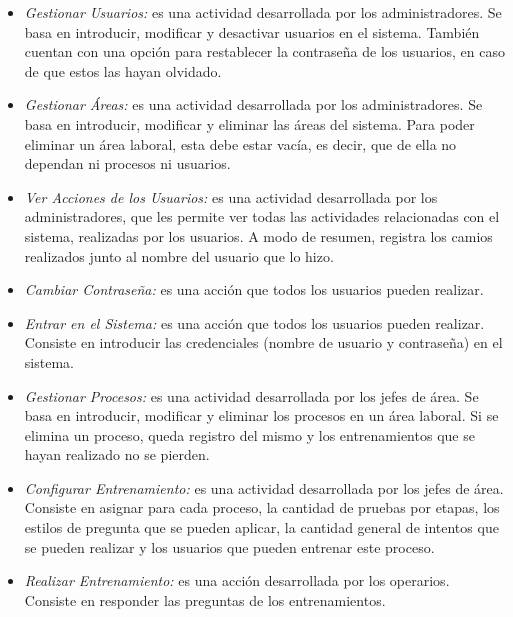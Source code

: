 \begin{itemize}
\item \textsl{Gestionar Usuarios:} es una actividad desarrollada por los administradores. Se basa en introducir, modificar y desactivar usuarios en el sistema. También cuentan con una opción para restablecer la contraseña de los usuarios, en caso de que estos las hayan olvidado.
\item \textsl{Gestionar Áreas:}  es una actividad desarrollada por los administradores. Se basa en introducir, modificar y eliminar las áreas del sistema. Para poder eliminar un área laboral, esta debe estar vacía, es decir, que de ella no dependan ni procesos ni usuarios.
\item \textsl{Ver Acciones de los Usuarios:}  es una actividad desarrollada por los administradores, que les permite ver todas las actividades relacionadas con el sistema, realizadas por los usuarios. A modo de resumen, registra los camios realizados junto al nombre del usuario que lo hizo.

\item \textsl{Cambiar Contraseña:} es una acción que todos los usuarios pueden realizar.
\item \textsl{Entrar en el Sistema:} es una acción que todos los usuarios pueden realizar. Consiste en introducir las credenciales (nombre de usuario y contraseña) en el sistema.

\item \textsl{Gestionar Procesos:} es una actividad desarrollada por los jefes de área. Se basa en introducir, modificar y eliminar los procesos en un área laboral. Si se elimina un proceso, queda registro del mismo y los entrenamientos que se hayan realizado no se pierden.
\item \textsl{Configurar Entrenamiento:}  es una actividad desarrollada por los jefes de área. Consiste en asignar para cada proceso, la cantidad de pruebas por etapas, los estilos de pregunta que se pueden aplicar, la cantidad general de intentos que se pueden realizar y los usuarios que pueden entrenar este proceso.

\item \textsl{Realizar Entrenamiento:} es una acción desarrollada por los operarios. Consiste en responder las preguntas de los entrenamientos.
\end{itemize}

